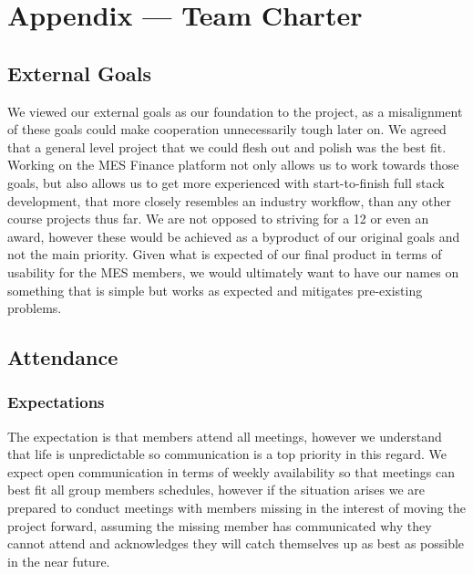 \documentclass{article}
\begin{document}
\newpage{}

\section*{Appendix --- Team Charter}


\subsection*{External Goals}

We viewed our external goals as our foundation to the project, as a misalignment of these goals could make cooperation unnecessarily tough later on. We agreed that a general level project that we could flesh out and polish was the best fit. Working on the MES Finance platform not only allows us to work towards those goals, but also allows us to get more experienced with start-to-finish full stack development, 
that more closely resembles an industry workflow, than any other course projects thus far. We are not opposed to striving for a 12 or even an award, however these would be achieved as a byproduct of our original goals and not the main priority. Given what is expected of our final product in terms of usability for the MES members, we would ultimately want to have our names on something that is simple but works as expected and mitigates pre-existing problems. 

\subsection*{Attendance}

\subsubsection*{Expectations}

The expectation is that members attend all meetings, however we understand that life is unpredictable so communication is a top priority in this regard. We expect open communication in terms of weekly availability so that meetings can best fit all group members schedules, however if the situation arises we are prepared to conduct meetings with members missing in the interest of moving the project forward, assuming the missing member has communicated why they cannot attend and acknowledges they will catch themselves up as best as possible in the near future.
\end{document}

